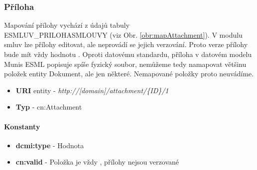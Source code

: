 \subsubsection{Příloha}

Mapování přílohy vychází z údajů tabuly \\ESMLUV\_PRILOHASMLOUVY (viz Obr. \ref{obr:mapAttachment}). V modulu smluv lze přílohy editovat, ale neprovádí se jejich verzování. Proto verze přílohy bude mít vždy hodnotu . Oproti datovému standardu, příloha v datovém modelu Munis ESML popisuje spíše fyzický soubor, nemůžeme tedy namapovat většinu položek entity Dokument, ale jen některé. Nemapované položky proto neuvádíme.

\begin{itemize}
\item \textbf{URI} entity  - \textit{http://[domain]/attachment/\{ID\}/1}
\item \textbf{Typ} - cn:Attachment
\end{itemize}

\paragraph*{Konstanty}
\begin{itemize}
\item \textbf{dcmi:type} - Hodnota 
\item \textbf{cn:valid} - Položka je vždy , přílohy nejsou verzované
\end{itemize}

